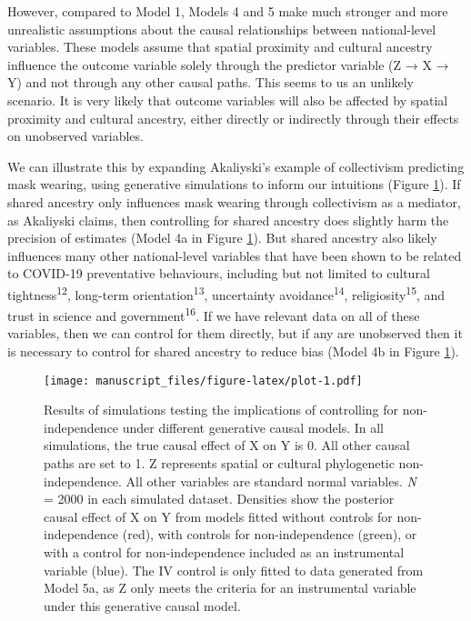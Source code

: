 \documentclass[
  man, donotrepeattitle,floatsintext]{apa6}
\begin{document}
However, compared to Model 1, Models 4 and 5 make much stronger and more
unrealistic assumptions about the causal relationships between
national-level variables. These models assume that spatial proximity and
cultural ancestry influence the outcome variable solely through the
predictor variable (Z → X → Y) and not through any other causal paths. This
seems to us an unlikely scenario. It is very likely that outcome variables
will also be affected by spatial proximity and cultural ancestry, either
directly or indirectly through their effects on unobserved variables.

We can illustrate this by expanding Akaliyski's example of collectivism
predicting mask wearing, using generative simulations to inform our intuitions
(Figure \ref{fig:plot}). If shared ancestry only influences mask
wearing through collectivism as a mediator, as Akaliyski claims, then
controlling for shared ancestry does slightly harm the precision of estimates
(Model 4a in Figure \ref{fig:plot}). But shared ancestry also likely
influences many other national-level variables that have been shown to be
related to COVID-19 preventative behaviours, including but not limited to
cultural tightness\textsuperscript{12}, long-term orientation\textsuperscript{13}, uncertainty
avoidance\textsuperscript{14}, religiosity\textsuperscript{15}, and trust in science
and government\textsuperscript{16}. If we have relevant data on all of these variables,
then we can control for them directly, but if any are unobserved then it is
necessary to control for shared ancestry to reduce bias (Model 4b in Figure
\ref{fig:plot}).



\begin{figure}
\centering
\texttt{[image: manuscript\_files/figure-latex/plot-1.pdf]}
\caption{\label{fig:plot}Results of simulations testing the implications of controlling for non-independence under different generative causal models. In all simulations, the true causal effect of X on Y is 0. All other causal paths are set to 1. Z represents spatial or cultural phylogenetic non-independence. All other variables are standard normal variables. \emph{N} = 2000 in each simulated dataset. Densities show the posterior causal effect of X on Y from models fitted without controls for non-independence (red), with controls for non-independence (green), or with a control for non-independence included as an instrumental variable (blue). The IV control is only fitted to data generated from Model 5a, as Z only meets the criteria for an instrumental variable under this generative causal model.}
\end{figure}
\end{document}
